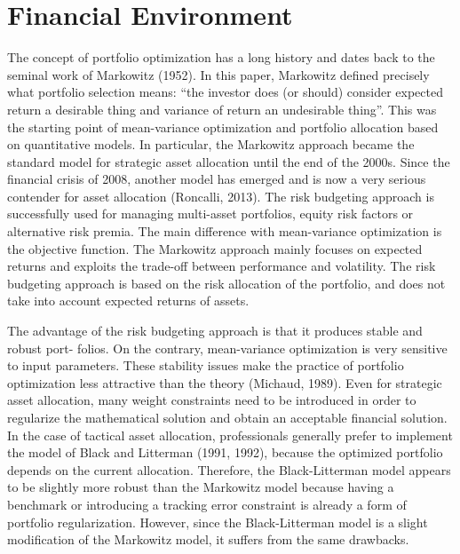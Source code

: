 \documentclass[]{usiinfdocprop}
\begin{document}
\section{Financial Environment}

The concept of portfolio optimization has a long history and dates back to the seminal work of Markowitz (1952). In this paper, Markowitz defined precisely what portfolio selection means: “the investor does (or should) consider expected return a desirable thing and variance of return an undesirable thing”. This was the starting point of mean-variance optimization and portfolio allocation based on quantitative models. In particular, the Markowitz approach became the standard model for strategic asset allocation until the end of the 2000s.
Since the financial crisis of 2008, another model has emerged and is now a very serious contender for asset allocation (Roncalli, 2013). The risk budgeting approach is successfully used for managing multi-asset portfolios, equity risk factors or alternative risk premia. The main difference with mean-variance optimization is the objective function. The Markowitz approach mainly focuses on expected returns and exploits the trade-off between performance and volatility. The risk budgeting approach is based on the risk allocation of the portfolio, and does not take into account expected returns of assets.

The advantage of the risk budgeting approach is that it produces stable and robust port- folios. On the contrary, mean-variance optimization is very sensitive to input parameters. These stability issues make the practice of portfolio optimization less attractive than the theory (Michaud, 1989). Even for strategic asset allocation, many weight constraints need to be introduced in order to regularize the mathematical solution and obtain an acceptable financial solution. In the case of tactical asset allocation, professionals generally prefer to implement the model of Black and Litterman (1991, 1992), because the optimized portfolio depends on the current allocation. Therefore, the Black-Litterman model appears to be slightly more robust than the Markowitz model because having a benchmark or introducing a tracking error constraint is already a form of portfolio regularization. However, since the Black-Litterman model is a slight modification of the Markowitz model, it suffers from the same drawbacks.
\end{document}
